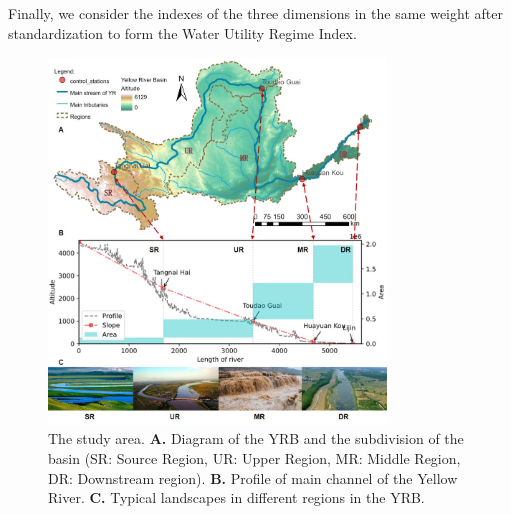 \documentclass[9pt,twoside,lineno]{pnas-new}
\begin{document}
Finally, we consider the indexes of the three dimensions in the same weight after standardization to form the Water Utility Regime Index.



\begin{figure}
    \centering
    \includegraphics[width=0.8\textwidth]{../../figures/sup/s1_study_area.jpg}
    \caption{
        The study area.
        \textbf{A.} Diagram of the YRB and the subdivision of the basin (SR: Source Region, UR: Upper Region, MR: Middle Region, DR: Downstream region).
        \textbf{B.} Profile of main channel of the Yellow River.
        \textbf{C.} Typical landscapes in different regions in the YRB.
    }
\end{figure}
\end{document}
